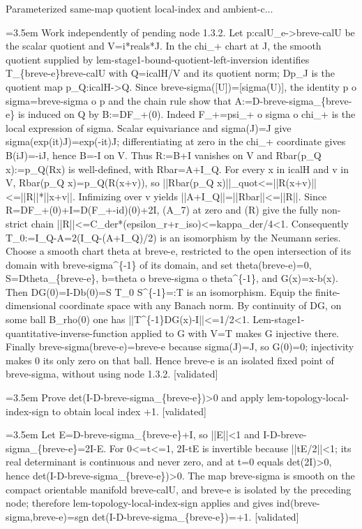 \documentclass{article}
\newcommand{\step}[1]{\par\noindent\hangindent=3.5em\hangafter=1%
  \makebox[3.5em][l]{\textbf{#1.}}}
\newcommand{\steptag}[1]{\hfill{\small\textsf{[#1]}}}
\begin{document}
\begin{proofbox}{Parameterized same-map quotient local-index and ambient-c...}
\step{1.4.2} Work independently of pending node 1.3.2. Let p:calU\_e->breve-calU be the scalar quotient and V=i*reals*J. In the chi\_+ chart at J, the smooth quotient supplied by lem-stage1-bound-quotient-left-inversion identifies T\_\{breve-e\}breve-calU with Q=icalH/V and its quotient norm; Dp\_J is the quotient map p\_Q:icalH->Q. Since breve-sigma([U])=[sigma(U)], the identity p o sigma=breve-sigma o p and the chain rule show that A:=D-breve-sigma\_\{breve-e\} is induced on Q by B:=DF\_+(0). Indeed F\_+=psi\_+ o sigma o chi\_+ is the local expression of sigma. Scalar equivariance and sigma(J)=J give sigma(exp(it)J)=exp(-it)J; differentiating at zero in the chi\_+ coordinate gives B(iJ)=-iJ, hence B=-I on V. Thus R:=B+I vanishes on V and Rbar(p\_Q x):=p\_Q(Rx) is well-defined, with Rbar=A+I\_Q. For every x in icalH and v in V, Rbar(p\_Q x)=p\_Q(R(x+v)), so ||Rbar(p\_Q x)||\_quot<=||R(x+v)||<=||R||*||x+v||. Infimizing over v yields ||A+I\_Q||=||Rbar||<=||R||. Since R=DF\_+(0)+I=D(F\_+-id)(0)+2I, (A\_7) at zero and (R) give the fully non-strict chain ||R||<=C\_der*(epsilon\_r+r\_iso)<=kappa\_der/4<1. Consequently T\_0:=I\_Q-A=2(I\_Q-(A+I\_Q)/2) is an isomorphism by the Neumann series. Choose a smooth chart theta at breve-e, restricted to the open intersection of its domain with breve-sigma\textasciicircum{}\{-1\} of its domain, and set theta(breve-e)=0, S=Dtheta\_\{breve-e\}, b=theta o breve-sigma o theta\textasciicircum{}\{-1\}, and G(x)=x-b(x). Then DG(0)=I-Db(0)=S T\_0 S\textasciicircum{}\{-1\}=:T is an isomorphism. Equip the finite-dimensional coordinate space with any Banach norm. By continuity of DG, on some ball B\_rho(0) one has ||T\textasciicircum{}\{-1\}DG(x)-I||<=1/2<1. Lem-stage1-quantitative-inverse-function applied to G with V=T makes G injective there. Finally breve-sigma(breve-e)=breve-e because sigma(J)=J, so G(0)=0; injectivity makes 0 its only zero on that ball. Hence breve-e is an isolated fixed point of breve-sigma, without using node 1.3.2. \steptag{validated} \\[4pt]
\step{1.5} Prove det(I-D-breve-sigma\_\{breve-e\})>0 and apply lem-topology-local-index-sign to obtain local index +1. \steptag{validated} \\[6pt]
\step{1.5.1} Let E=D-breve-sigma\_\{breve-e\}+I, so ||E||<1 and I-D-breve-sigma\_\{breve-e\}=2I-E. For 0<=t<=1, 2I-tE is invertible because ||tE/2||<1; its real determinant is continuous and never zero, and at t=0 equals det(2I)>0, hence det(I-D-breve-sigma\_\{breve-e\})>0. The map breve-sigma is smooth on the compact orientable manifold breve-calU, and breve-e is isolated by the preceding node; therefore lem-topology-local-index-sign applies and gives ind(breve-sigma,breve-e)=sgn det(I-D-breve-sigma\_\{breve-e\})=+1. \steptag{validated} \\[4pt]
\end{proofbox}
\end{document}
